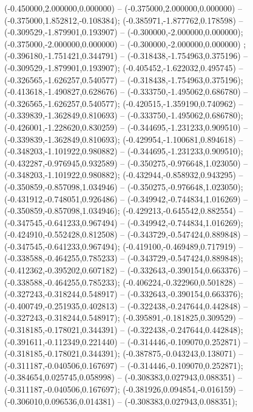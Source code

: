  (-0.450000,2.000000,0.000000) -- (-0.375000,2.000000,0.000000) -- (-0.375000,1.852812,-0.108384);
 (-0.385971,-1.877762,0.178598) -- (-0.309529,-1.879901,0.193907) -- (-0.300000,-2.000000,0.000000);
 (-0.375000,-2.000000,0.000000) -- (-0.300000,-2.000000,0.000000) ;
 (-0.396180,-1.751421,0.344791) -- (-0.318438,-1.754963,0.375196) -- (-0.309529,-1.879901,0.193907);
 (-0.405452,-1.622032,0.495745) -- (-0.326565,-1.626257,0.540577) -- (-0.318438,-1.754963,0.375196);
 (-0.413618,-1.490827,0.628676) -- (-0.333750,-1.495062,0.686780) -- (-0.326565,-1.626257,0.540577);
 (-0.420515,-1.359190,0.740962) -- (-0.339839,-1.362849,0.810693) -- (-0.333750,-1.495062,0.686780);
 (-0.426001,-1.228620,0.830259) -- (-0.344695,-1.231233,0.909510) -- (-0.339839,-1.362849,0.810693);
 (-0.429954,-1.100681,0.894618) -- (-0.348203,-1.101922,0.980882) -- (-0.344695,-1.231233,0.909510);
 (-0.432287,-0.976945,0.932589) -- (-0.350275,-0.976648,1.023050) -- (-0.348203,-1.101922,0.980882);
 (-0.432944,-0.858932,0.943295) -- (-0.350859,-0.857098,1.034946) -- (-0.350275,-0.976648,1.023050);
 (-0.431912,-0.748051,0.926486) -- (-0.349942,-0.744834,1.016269) -- (-0.350859,-0.857098,1.034946);
 (-0.429213,-0.645542,0.882554) -- (-0.347545,-0.641233,0.967494) -- (-0.349942,-0.744834,1.016269);
 (-0.424910,-0.552428,0.812508) -- (-0.343729,-0.547424,0.889848) -- (-0.347545,-0.641233,0.967494);
 (-0.419100,-0.469489,0.717919) -- (-0.338588,-0.464255,0.785233) -- (-0.343729,-0.547424,0.889848);
 (-0.412362,-0.395202,0.607182) -- (-0.332643,-0.390154,0.663376) -- (-0.338588,-0.464255,0.785233);
 (-0.406224,-0.322960,0.501828) -- (-0.327243,-0.318244,0.548917) -- (-0.332643,-0.390154,0.663376);
 (-0.400749,-0.251935,0.402813) -- (-0.322438,-0.247644,0.442848) -- (-0.327243,-0.318244,0.548917);
 (-0.395891,-0.181825,0.309529) -- (-0.318185,-0.178021,0.344391) -- (-0.322438,-0.247644,0.442848);
 (-0.391611,-0.112349,0.221440) -- (-0.314446,-0.109070,0.252871) -- (-0.318185,-0.178021,0.344391);
 (-0.387875,-0.043243,0.138071) -- (-0.311187,-0.040506,0.167697) -- (-0.314446,-0.109070,0.252871);
 (-0.384654,0.025745,0.058998) -- (-0.308383,0.027943,0.088351) -- (-0.311187,-0.040506,0.167697);
 (-0.381926,0.094854,-0.016159) -- (-0.306010,0.096536,0.014381) -- (-0.308383,0.027943,0.088351);
